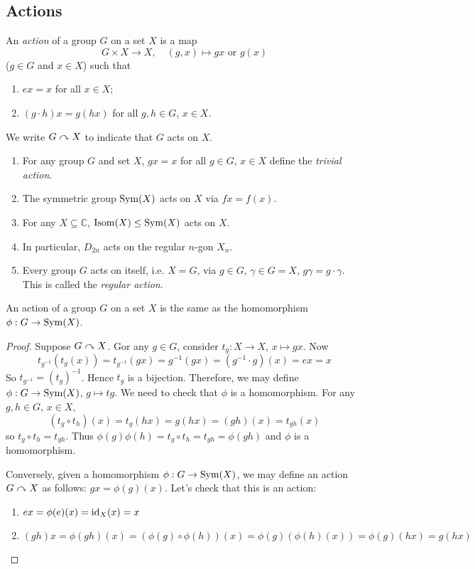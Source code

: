 \documentclass[10pt, a4paper, twoside]{report}
\begin{document}
\subsection{Actions}
\begin{definition}
    An \emph{action} of a group \(G\) on a set \(X\) is a map 
    \[G\times X\to X,\quad (g,x)\mapsto gx\text{  or  }g(x)\]
    (\(g\in G\) and \(x\in X\)) such that 
    \begin{enumerate}
        \item \(ex=x\) for all \(x\in X\);
        \item \((g\cdot h)x=g(hx)\) for all \(g,h\in G\), \(x\in X\).
    \end{enumerate}
\end{definition}
We write \(G\curvearrowright X\) to indicate that \(G\) acts on \(X\).
\begin{example} \item[] 
    \begin{enumerate}
        \item For any group \(G\) and set \(X\), \(gx=x\) for all \(g\in G\), \(x\in X\) define the \emph{trivial action}.
        \item The symmetric group \(\operatorname{Sym}(X)\) acts on \(X\) via \(fx=f(x)\).
        \item For any \(X\subseteq\mathbb{C}\), \(\operatorname{Isom}(X)\leq\operatorname{Sym}(X)\) acts on \(X\).
        \item In particular, \(D_{2n}\) acts on the regular \(n\)-gon \(X_n\). 
        \item Every group \(G\) acts on itself, i.e. \(X=G\), via \(g\in G\), \(\gamma\in G=X\), \(g\gamma=g\cdot\gamma\). This is called the \emph{regular action}.
    \end{enumerate}
\end{example}
\begin{theorem}
    An action of a group \(G\) on a set \(X\) is the same as the homomorphism \(\phi:G\to\operatorname{Sym}(X)\).
    \label{thm:action_homom}
\end{theorem}
\begin{proof}
    Suppose \(G\curvearrowright X\). Gor any \(g\in G\), consider \(t_g:X\to X\), \(x\mapsto gx\). Now
    \[t_{g^{-1}}(t_g(x))=t_{g^{-1}}(gx)=g^{-1}(gx)=(g^{-1}\cdot g)(x)=ex=x\]
    So \(t_{g^{-1}}=(t_g)^{-1}\). Hence \(t_g\) is a bijection. Therefore, we may define \(\phi:G\to\operatorname{Sym}(X)\), \(g\mapsto tg\). We need to check that \(\phi\) is a homomorphism. For any \(g,h\in G\), \(x\in X\), 
    \[(t_g\circ t_h)(x)=t_g(hx)=g(hx)=(gh)(x)=t_{gh}(x)\]
    so \(t_g\circ t_h=t_{gh}\). Thus \(\phi(g)\phi(h)=t_g\circ t_h=t_{gh}=\phi(gh)\) and \(\phi\) is a homomorphism.

    Conversely, given a homomorphism \(\phi:G\to\operatorname{Sym}(X)\), we may define an action \(G\curvearrowright X\) as follows: \(gx=\phi(g)(x)\). Let's check that this is an action:
    \begin{enumerate}
        \item \(ex=\phi(e)(x)=\operatorname{id}_X(x)=x\) 
        \item \((gh)x=\phi(gh)(x)=(\phi(g)\circ\phi(h))(x)=\phi(g)(\phi(h)(x))=\phi(g)(hx)=g(hx)\)
    \end{enumerate}
\end{proof}
\end{document}
